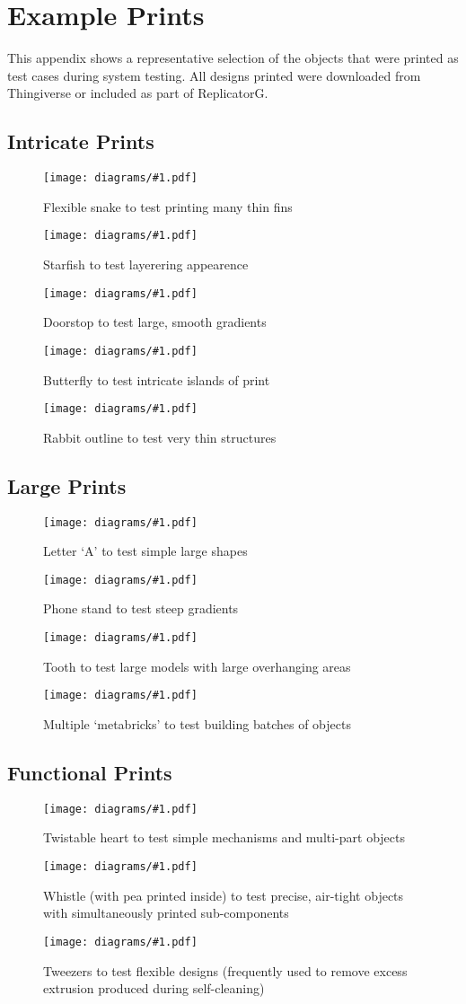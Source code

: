 \chapter{Example Prints}
	
	\label{sec:examplePrints}
	
	\newcommand{\examplePrint}[2]{
		\begin{figure}[H]
			\texttt{[image: diagrams/\#1.pdf]}
			\caption{#2}
			\label{fig:#1}
		\end{figure}
	}
	
	This appendix shows a representative selection of the objects that were
	printed as test cases during system testing. All designs printed were
	downloaded from Thingiverse or included as part of ReplicatorG.
	
	\section{Intricate Prints}
		
		\examplePrint{snake}{Flexible snake to test printing many thin fins}
		
		\examplePrint{starfish}{Starfish to test layerering appearence}
		
		\examplePrint{doorstop}{Doorstop to test large, smooth gradients}
		
		\examplePrint{butterfly}{Butterfly to test intricate islands of print}
		
		\examplePrint{rabbit}{Rabbit outline to test very thin structures}
		
	\section{Large Prints}
		
		\examplePrint{letter}{Letter `A' to test simple large shapes}
		
		\examplePrint{phoneDock}{Phone stand to test steep gradients}
		
		\examplePrint{tooth}{Tooth to test large models with large overhanging areas}
		
		\examplePrint{joblot}{Multiple `metabricks' to test building batches of objects}
		
	\section{Functional Prints}
		
		\examplePrint{heart}{Twistable heart to test simple mechanisms and
		                     multi-part objects}
		
		\examplePrint{whistle}{Whistle (with pea printed inside) to test precise,
		                       air-tight objects with simultaneously printed
		                       sub-components}
		
		\examplePrint{tweezers}{Tweezers to test flexible designs (frequently used
		                        to remove excess extrusion produced during
		                        self-cleaning)}
